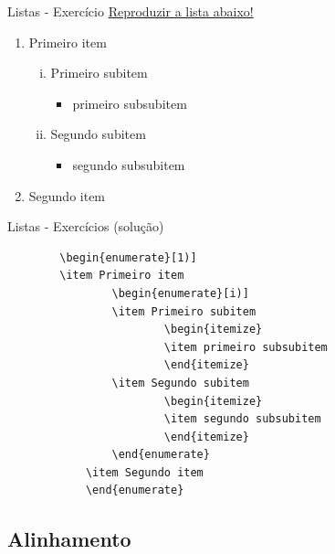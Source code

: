 \documentclass[c]{beamer}
\begin{document}
{\begin{frame}[fragile]{\sc Listas - Exercício}
	\underline{Reproduzir a lista abaixo!}
	    \begin{enumerate}[1)]
	    	\item Primeiro item
	    	\begin{enumerate}[i)]
	    		\item Primeiro subitem
	    		\begin{itemize}
	    			\item primeiro subsubitem
	    		\end{itemize}
	    		\item Segundo subitem
	    		\begin{itemize}
	    			\item segundo subsubitem
	    		\end{itemize}
	    	\end{enumerate}
	    	\item Segundo item
	    \end{enumerate}
\end{frame}

\begin{frame}[fragile]{\sc Listas - Exercícios (solução)}
\begin{verbatim}
	    \begin{enumerate}[1)]
	    \item Primeiro item
		        \begin{enumerate}[i)]
		        \item Primeiro subitem
			            \begin{itemize}
			            \item primeiro subsubitem
			            \end{itemize}
		        \item Segundo subitem
			            \begin{itemize}
			            \item segundo subsubitem
			            \end{itemize}
		        \end{enumerate}
		    \item Segundo item
		    \end{enumerate}
\end{verbatim}
\end{frame}


\subsection{Alinhamento}

}
\end{document}
